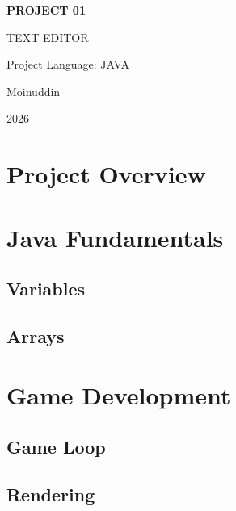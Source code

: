 \documentclass[12pt]{article}
\begin{document}
    \begin{titlepage}
        \centering
        \vspace*{1cm}

        {\Huge\bfseries PROJECT 01\par}

        \vspace{2cm}

        {\large TEXT EDITOR\par}

        \vspace{2cm}

        {\large Project Language: JAVA\par}

        \vfill

        {\large Moinuddin\par}

        \vspace{0.5cm}

        {\large 2026\par}

    \end{titlepage}

    \tableofcontents
    \newpage
    \section{Project Overview}
    \section{Java Fundamentals}
    \subsection{Variables}
    \subsection{Arrays}
    \section{Game Development}
    \subsection{Game Loop}
    \subsection{Rendering}
\end{document}
